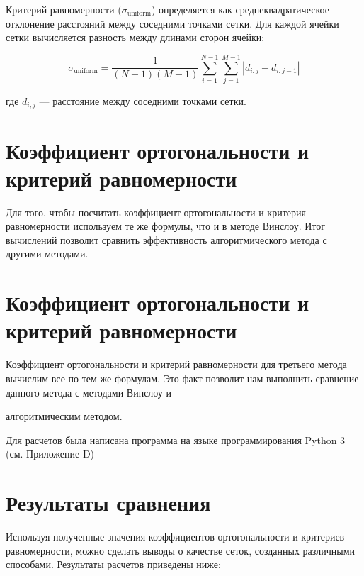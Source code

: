 \documentclass[a4paper,14pt,russian]{extreport}
\renewcommand{\_}{\kern-1.5pt\textunderscore\kern-1.5pt}
\begin{document}
Критерий равномерности (\(\sigma_{\text{uniform}}\)) определяется как среднеквадратическое отклонение расстояний между соседними точками сетки. Для каждой ячейки сетки вычисляется разность между длинами сторон ячейки:

\[
\sigma_{\text{uniform}} = \frac{1}{(N-1)(M-1)} \sum_{i=1}^{N-1} \sum_{j=1}^{M-1} \left|d_{i,j} - d_{i,j-1}\right|
\]

где \(d_{i,j}\) — расстояние между соседними точками сетки.


\section{Коэффициент ортогональности и критерий равномерности}

Для того, чтобы посчитать коэффициент ортогональности и критерия равномерности используем те же формулы, что и в методе Винслоу. Итог вычислений позволит сравнить эффективность алгоритмического метода с другими методами.

\section{Коэффициент ортогональности и критерий равномерности}

\par Коэффициент ортогональности и критерий равномерности для третьего метода вычислим все по тем же формулам. Это факт позволит нам выполнить сравнение данного метода с методами Винслоу и \par алгоритмическим методом.
   
Для расчетов была написана программа на языке программирования Python 3 (см. Приложение D)

\section{Результаты сравнения}

Используя полученные значения коэффициентов ортогональности и критериев равномерности, можно сделать выводы о качестве сеток, созданных различными способами. Результаты расчетов приведены ниже:
\end{document}
